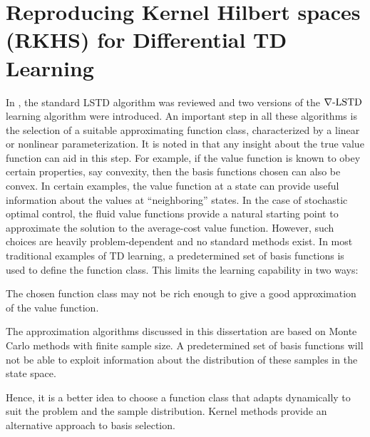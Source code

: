\chapter{Reproducing Kernel Hilbert spaces (RKHS) for Differential TD Learning}
\label{ch:rkhs}
In , the standard LSTD algorithm was reviewed and two versions of the $\nabla\text{-LSTD}$ learning algorithm were  introduced. An important step in all these algorithms is the selection of a suitable approximating function class, characterized by  a linear or nonlinear parameterization. It is noted in \cite{ctcn} that any insight about the true value function can aid in this step. For example, if the value function is known to obey certain properties, say convexity, then the basis functions chosen can also be convex.  In certain examples, the value function at a state can provide useful information about the values at ``neighboring'' states. In the case of stochastic optimal control, the fluid value functions provide a natural starting point to approximate the solution to the average-cost value function. However, such choices are heavily problem-dependent and no standard methods exist. In most traditional examples of TD learning, a predetermined set of basis functions is used to define the function class. This limits the learning capability in two ways:
\begin{romannum}
	\item The chosen function class may not be rich enough to give a good approximation of the value function.
	\item The approximation algorithms discussed in this dissertation are based on Monte Carlo methods with finite sample size. A predetermined set of basis functions will not be able to exploit information about the distribution of these samples in the state space.  
\end{romannum}
Hence, it is a better idea to choose a function class that adapts dynamically to suit the problem and the sample distribution. Kernel methods provide an alternative approach to basis selection. 

